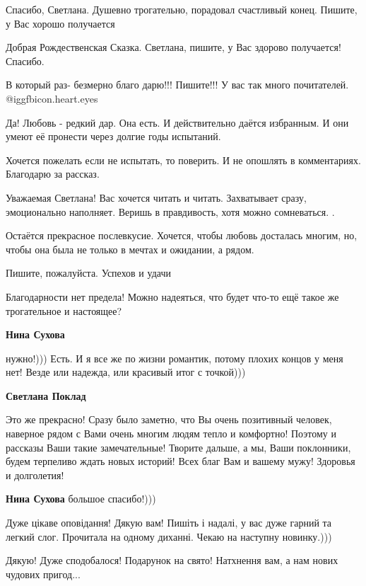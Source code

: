 \begin{itemize}

Спасибо, Светлана. Душевно трогательно, порадовал счастливый конец. Пишите, у
Вас хорошо получается


Добрая Рождественская Сказка. Светлана, пишите, у Вас здорово получается! Спасибо.


В который раз- безмерно благо дарю!!! Пишите!!! У вас так много почитателей. @igg{fbicon.heart.eyes} 


Да! Любовь - редкий дар. Она есть. И действительно даётся избранным. И они умеют
её пронести через долгие годы испытаний.

Хочется пожелать если не испытать, то поверить. И не опошлять в комментариях.
Благодарю за рассказ.


Уважаемая Светлана! Вас хочется читать и читать. Захватывает сразу,
эмоционально наполняет. Веришь в правдивость, хотя можно сомневаться. .

Остаётся прекрасное послевкусие. Хочется, чтобы любовь досталась многим, но,
чтобы она была не только в мечтах и ожидании, а рядом.

Пишите, пожалуйста. Успехов и удачи


Благодарности нет предела! Можно надеяться, что будет что-то ещё такое же
трогательное и настоящее?

\textbf{Нина Сухова} 

нужно!))) Есть. И я все же по жизни романтик, потому плохих концов у меня нет!
Везде или надежда, или красивый итог с точкой)))

\textbf{Светлана Поклад} 

Это же прекрасно! Сразу было заметно, что Вы очень позитивный человек, наверное
рядом с Вами очень многим людям тепло и комфортно! Поэтому и рассказы Ваши
такие замечательные! Творите дальше, а мы, Ваши поклонники, будем терпеливо
ждать новых историй! Всех благ Вам и вашему мужу! Здоровья и долголетия!

\textbf{Нина Сухова} большое спасибо!)))


Дуже цікаве оповідання! Дякую вам! Пишіть і надалі, у вас дуже гарний та легкий
слог. Прочитала на одному диханні. Чекаю на наступну новинку.)))


Дякую! Дуже сподобалося!
Подарунок на свято!
Натхнення вам, а нам нових чудових пригод...

\end{itemize} %

